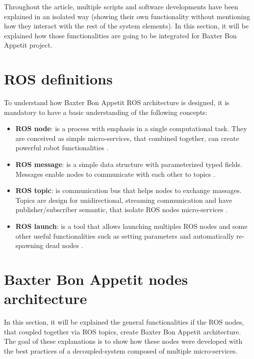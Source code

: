 \documentclass[11pt]{report} %
\begin{document}
Throughout the article, multiple scripts and software developments have been explained in an isolated way (showing their own functionality without mentioning how they interact with the rest of the system elements). In this section, it will be explained how those functionalities are going to be integrated for Baxter Bon Appetit project.\\

\section{ROS definitions}
To understand how Baxter Bon Appetit ROS architecture is designed, it is mandatory to have a basic understanding of the following concepts:

\begin{itemize}
    \item \textbf{ROS node}: is a process with emphasis in a single computational task. They are conceived as simple micro-services, that combined together, can create powerful robot functionalities \citep{cite_ros_node}.
    \item \textbf{ROS message}: is a simple data structure with parameterized typed fields. Messages enable nodes to communicate with each other to topics \citep{cite_ros_message}.
    \item \textbf{ROS topic}: is communication bus that helps nodes to exchange massages. Topics are design for unidirectional, streaming communication and have publisher/subscriber semantic, that isolate ROS nodes micro-services \citep{cite_ros_topic}.
    \item \textbf{ROS launch}: is a tool that allows launching multiples ROS nodes and some other useful functionalities such as setting parameters and automatically re-spawning dead nodes \citep{cite_ros_launch}. 
\end{itemize}

\section{Baxter Bon Appetit nodes architecture}

In this section, it will be explained the general functionalities if the ROS nodes, that coupled together via ROS topics, create Baxter Bon Appetit architecture. The goal of these explanations is to show how these nodes were developed with the best practices of a decoupled-system composed of multiple micro-services. \\
\end{document}
